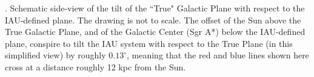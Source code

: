 \textbf{\label{fig:galcoords}}. Schematic side-view of the tilt of the ``True" Galactic Plane with respect to the IAU-defined plane. The drawing is not to scale. The offset of the Sun above the True Galactic Plane, and of the Galactic Center (Sgr A*) below the IAU-defined plane, conspire to tilt the IAU system with respect to the True Plane (in this simplified view) by roughly $0.13^\circ$, meaning that the red and blue lines shown here cross at a distance roughly 12 kpc from the Sun.  